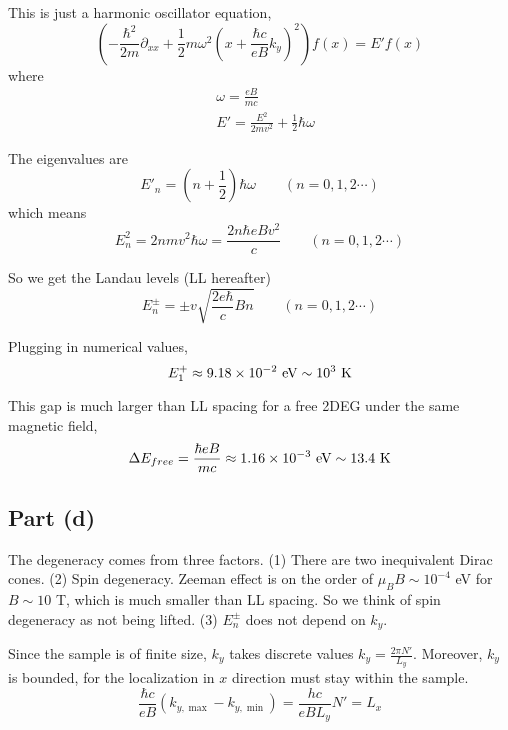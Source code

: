 \documentclass{article}
\begin{document}
This is just a harmonic oscillator equation,
\begin{equation*}
\left(-\frac{\hbar^2}{2m}\partial_{xx}+\frac{1}{2}m\omega^2\left(x+\frac{\hbar c}{eB}k_y\right)^2\right)f(x)=E'f(x)
\end{equation*}
where
\begin{align*}
&\omega=\frac{eB}{mc}\\
&E'=\frac{E^2}{2mv^2}+\frac{1}{2}\hbar\omega
\end{align*}

The eigenvalues are
\begin{equation*}
E'_n=\left(n+\frac{1}{2}\right)\hbar\omega\quad\quad(n=0,1,2\cdots)
\end{equation*}
which means
\begin{equation*}
E^2_n=2nmv^2\hbar\omega=\frac{2n\hbar eBv^2}{c}\quad\quad(n=0,1,2\cdots)
\end{equation*}

So we get the Landau levels (LL hereafter)
\begin{equation*}
E_n^{\pm}=\pm v\sqrt{\frac{2e\hbar}{c}Bn}\quad\quad(n=0,1,2\cdots)
\end{equation*}

Plugging in numerical values,
\begin{equation*}
E_1^+\approx9.18\times10^{-2}\textup{ eV}\sim10^3\textup{ K}
\end{equation*}

This gap is much larger than LL spacing for a free 2DEG under the same magnetic field,
\begin{equation*}
\Delta E_{free}=\frac{\hbar eB}{mc}\approx1.16\times10^{-3}\textup{ eV}\sim13.4\textup{ K}
\end{equation*}

\subsection{Part (d)}
The degeneracy comes from three factors. (1) There are two inequivalent Dirac cones. (2) Spin degeneracy. Zeeman effect is on the order of $\mu_BB\sim10^{-4}$ eV for $B\sim10$ T, which is much smaller than LL spacing. So we think of spin degeneracy as not being lifted. (3) $E_n^{\pm}$ does not depend on $k_y$.

Since the sample is of finite size, $k_y$ takes discrete values $k_y=\frac{2\pi N'}{L_y}$. Moreover, $k_y$ is bounded, for the localization in $x$ direction must stay within the sample.
\begin{equation*}
\frac{\hbar c}{eB}(k_{y,\max}-k_{y,\min})=\frac{h c}{eBL_y}N'=L_x
\end{equation*}
\end{document}
